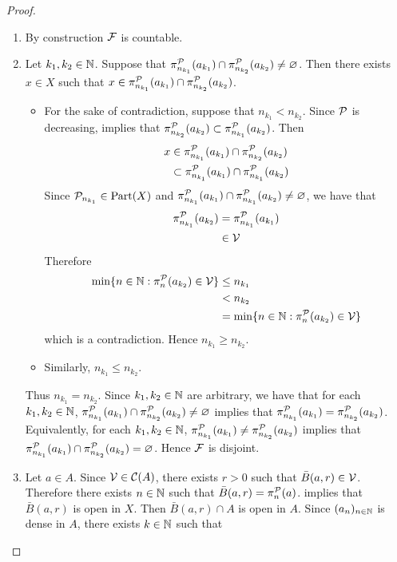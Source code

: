 \documentclass{book}
\begin{document}
\begin{proof}
\begin{itemize}
			\begin{enumerate}
				\item By construction $\mathcal{F}$ is countable.
				\item Let $k_1, k_2 \in \mathbb{N}$. Suppose that $\pi^{\mathcal{P}}_{n_{k_1}}(a_{k_1}) \cap \pi^{\mathcal{P}}_{n_{k_2}}(a_{k_2}) \neq \varnothing$. Then there exists $x \in X$ such that $x \in \pi^{\mathcal{P}}_{n_{k_1}}(a_{k_1}) \cap \pi^{\mathcal{P}}_{n_{k_2}}(a_{k_2})$. 
				\begin{itemize}
					\item For the sake of contradiction, suppose that $n_{k_1} < n_{k_2}$. Since $\mathcal{P}$ is decreasing,  implies that $\pi^{\mathcal{P}}_{n_{k_2}}(a_{k_2}) \subset \pi^{\mathcal{P}}_{n_{k_1}}(a_{k_2})$. Then
					\begin{align*}
						x
						& \in \pi^{\mathcal{P}}_{n_{k_1}}(a_{k_1}) \cap \pi^{\mathcal{P}}_{n_{k_2}}(a_{k_2}) \\
						& \subset \pi^{\mathcal{P}}_{n_{k_1}}(a_{k_1}) \cap \pi^{\mathcal{P}}_{n_{k_1}}(a_{k_2}) 
					\end{align*}
					Since $\mathcal{P}_{n_{k_1}} \in \text{Part}(X)$ and $\pi^{\mathcal{P}}_{n_{k_1}}(a_{k_1}) \cap \pi^{\mathcal{P}}_{n_{k_1}}(a_{k_2}) \neq \varnothing$, we have that 
					\begin{align*}
						\pi^{\mathcal{P}}_{n_{k_1}}(a_{k_2})
						& = \pi^{\mathcal{P}}_{n_{k_1}}(a_{k_1}) \\
						& \in \mathcal{V}
					\end{align*}
					Therefore
					\begin{align*}
						\min \{n \in \mathbb{N}: \pi^{\mathcal{P}}_n(a_{k_2}) \in \mathcal{V}\}
						& \leq n_{k_1} \\
						& < n_{k_2} \\
						& = \min \{n \in \mathbb{N}: \pi^{\mathcal{P}}_n(a_{k_2}) \in \mathcal{V}\}
					\end{align*}
					which is a contradiction. Hence $n_{k_1} \geq n_{k_2}$. 
					\item Similarly, $n_{k_1} \leq n_{k_2}$.
				\end{itemize}
				Thus $n_{k_1} = n_{k_2}$. Since $k_1, k_2 \in \mathbb{N}$ are arbitrary, we have that for each $k_1, k_2 \in \mathbb{N}$, $\pi^{\mathcal{P}}_{n_{k_1}}(a_{k_1}) \cap \pi^{\mathcal{P}}_{n_{k_2}}(a_{k_2}) \neq \varnothing$ implies that $\pi^{\mathcal{P}}_{n_{k_1}}(a_{k_1}) = \pi^{\mathcal{P}}_{n_{k_2}}(a_{k_2})$. Equivalently, for each $k_1, k_2 \in \mathbb{N}$, $\pi^{\mathcal{P}}_{n_{k_1}}(a_{k_1}) \neq \pi^{\mathcal{P}}_{n_{k_2}}(a_{k_2})$ implies that $\pi^{\mathcal{P}}_{n_{k_1}}(a_{k_1}) \cap \pi^{\mathcal{P}}_{n_{k_2}}(a_{k_2}) = \varnothing$. Hence $\mathcal{F}$ is disjoint.
				\item Let $a \in A$. Since $\mathcal{V} \in \mathcal{C}(A)$, there exists $r > 0$ such that $\bar{B}(a, r) \in \mathcal{V}$. Therefore there exists $n \in \mathbb{N}$ such that $\bar{B}(a, r) = \pi^{\mathcal{P}}_n(a)$.  implies that $\bar{B}(a, r)$ is open in $X$. Then $\bar{B}(a, r) \cap A$ is open in $A$. Since $(a_n)_{n \in \mathbb{N}}$ is dense in $A$, there exists $k \in \mathbb{N}$ such that 

\end{enumerate}
\end{itemize}
\end{proof}
\end{document}

